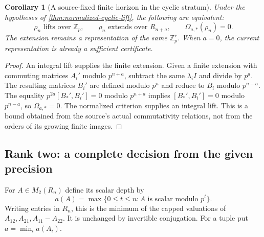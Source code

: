 \documentclass[11pt]{article}
\newtheorem{corollary}[theorem]{Corollary}
\theoremstyle{definition}
\theoremstyle{remark}
\begin{document}
\begin{corollary}[A source-fixed finite horizon in the cyclic stratum]\label{cor:abelian-cyclic-horizon}
Under the hypotheses of \cref{thm:normalized-cyclic-lift}, the following are equivalent:
\[
 \rho_n\text{ lifts over }\mathbb Z_p,
 \qquad \rho_n\text{ extends over }R_{n+a},
 \qquad \Omega_{a,*}(\rho_n)=0.
\]
The extension remains a representation of the same $\mathbb Z_p^r$. When $a=0$, the current representation is already a sufficient certificate.
\end{corollary}
\begin{proof}
An integral lift supplies the finite extension. Given a finite extension with commuting matrices $A_i'$ modulo $p^{n+a}$, subtract the same $\lambda_iI$ and divide by $p^a$. The resulting matrices $B_i'$ are defined modulo $p^n$ and reduce to $B_i$ modulo $p^{n-a}$. The equality
$p^{2a}[B_*',B_i']=0$ modulo $p^{n+a}$ implies
$[B_*',B_i']=0$ modulo $p^{n-a}$, so $\Omega_{a,*}=0$. The normalized criterion supplies an integral lift. This is a bound obtained from the source's actual commutativity relations, not from the orders of its growing finite images.
\end{proof}

\subsection{Rank two: a complete decision from the given precision}

For $A\in M_2(R_n)$ define its scalar depth by
\[
 a(A)=\max\{0\leq t\leq n:A\text{ is scalar modulo }p^t\}.
\]
Writing entries in $R_n$, this is the minimum of the capped valuations of
$A_{12},A_{21},A_{11}-A_{22}$. It is unchanged by invertible conjugation. For a tuple put $a=\min_i a(A_i)$.
\end{document}
